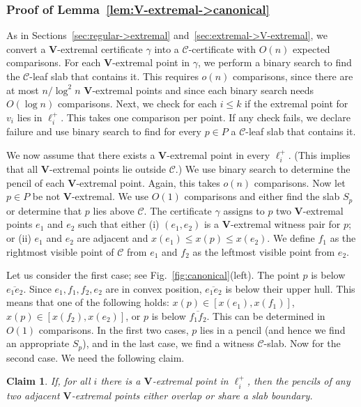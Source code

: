 \documentclass[letterpaper,11pt]{article}
\newtheorem{claim}[theorem]{Claim}
\newcommand{\cC}{\mathcal{C}}
\begin{document}
\subsubsection{Proof of Lemma~\ref{lem:V-extremal->canonical}}
\label{sec:V-extremal->canonical}

As in Sections~\ref{sec:regular->extremal} 
and~\ref{sec:extremal->V-extremal}, we convert a
$\textbf{V}$-extremal certificate $\gamma$
into a $\cC$-certificate with $O(n)$ 
expected comparisons.
For each $\textbf{V}$-extremal point in 
$\gamma$, we perform a binary search to 
find the $\cC$-leaf slab that contains 
it. This requires $o(n)$ comparisons, 
since there are at most $n/\log^2 n$ 
$\textbf{V}$-extremal points and 
since each binary search needs 
$O(\log n)$ comparisons. Next, we 
check for each $i \leq k$ if 
the extremal point for $v_i$ lies 
in $\ell^+_i$. This takes one 
comparison per point. If any check 
fails, we declare failure and use 
binary search to find for every 
$p \in P$ a $\cC$-leaf slab that 
contains it.

We now assume that there exists a 
$\textbf{V}$-extremal point
in every $\ell^+_i$. (This implies 
that all $\textbf{V}$-extremal points
lie outside $\cC$.) We use binary search 
to determine the pencil of each 
$\textbf{V}$-extremal point. Again, 
this takes $o(n)$ comparisons.
Now let $p \in P$ be not 
$\textbf{V}$-extremal. We use $O(1)$ 
comparisons and either find the slab $S_p$
or determine that $p$ lies above $\cC$.
The certificate $\gamma$ assigns to 
$p$ two $\textbf{V}$-extremal points 
$e_1$ and $e_2$ such that either 
(i) $(e_1, e_2)$ is a 
$\textbf{V}$-extremal witness pair 
for $p$; or (ii) $e_1$ and $e_2$ 
are adjacent and 
$x(e_1) \leq x(p) \leq x(e_2)$. 
We define $f_1$ as the rightmost
visible point of $\cC$ from $e_1$ 
and $f_2$ as the leftmost visible
point from $e_2$. 

Let us consider the first case; see 
Fig.~\ref{fig:canonical}(left). The
point $p$ is below $\overline{e_1 e_2}$. 
Since $e_1, f_1, f_2, e_2$ are in 
convex position, $\overline{e_1 e_2}$ is 
below their upper hull.
This means that one of the following 
holds:
$x(p) \in [x(e_1),x(f_1)]$, 
$x(p) \in [x(f_2),x(e_2)]$, or $p$
is below $\overline{f_1 f_2}$. 
This can be determined in $O(1)$
comparisons. In the first two 
cases, $p$ lies in a pencil (and 
hence we find an appropriate $S_p$),
and in the last case, we find a 
witness $\cC$-slab. Now for the second case. 
We need the following claim.

\begin{claim}\label{clm:overlap}
  If, for all $i$ there 
  is a $\textbf{V}$-extremal 
  point in $\ell^+_i$, then the 
  pencils of any two adjacent 
  $\textbf{V}$-extremal points 
  either overlap or share a slab boundary.
\end{claim}
\end{document}
